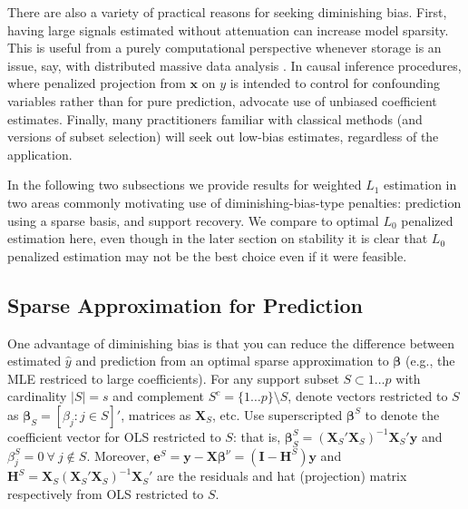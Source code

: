 \documentclass[12pt]{article}
\newcommand{\bs}[1]{\boldsymbol{#1}}
\newcommand{\bm}[1]{\mathbf{#1}}
\begin{document}
There are also a variety of practical reasons for seeking diminishing bias.
First, having large signals estimated without attenuation can increase model
sparsity. This is useful from a purely computational perspective whenever
storage is an issue, say, with distributed massive data analysis
\citep{taddy_distributed_2013}. In causal inference procedures, where
penalized projection from $\bm{x}$ on $y$ is intended to control for
confounding variables rather than for pure prediction,
\citet{belloni_inference_2012} advocate use of unbiased coefficient estimates.
Finally, many
practitioners familiar with classical methods (and versions of subset
selection) will seek out low-bias estimates, regardless of the application.

In the following two subsections we provide results for weighted $L_1$ estimation in two areas commonly motivating use of diminishing-bias-type penalties: prediction using a sparse basis, and support recovery.  We compare to optimal $L_0$ penalized estimation here, even though in the later section on stability it is clear that $L_0$ penalized estimation may not be the best choice even if it were feasible.

\subsection{Sparse Approximation for Prediction}

One advantage of diminishing bias is that you can reduce the difference between estimated $\hat y$ and prediction from an optimal sparse approximation to
$\bs{\beta}$ (e.g., the MLE restriced to large coefficients).  For any support subset $S \subset 1\ldots p$ with cardinality $|S|=s$ and complement $S^c = \{1\ldots p\}\setminus S$, denote vectors
restricted to $S$ as $\bm{\beta}_S = [\beta_j:j\in S]'$, matrices as $\bm{X}_S$, etc.  Use superscripted $\bs{\beta}^S$ to denote the coefficient vector for OLS restricted to $S$: that is, $\bs{\beta}^S_S = (\bm{X}_S'\bm{X}_S)^{-1}\bm{X}_S'\bm{y}$ and $\beta^{S}_j = 0~\forall~j\notin S$.  Moreover, 
$\bm{e}^S = \bm{y}-\bm{X}\bs{\beta}^\nu = (\bm{I}-\bm{H}^S)\bm{y}$ and 
$\bm{H}^S = \bm{X}_S(\bm{X}_S'\bm{X}_S)^{-1}\bm{X}_S'$ are the residuals and hat (projection) matrix respectively from OLS restricted to $S$.
\end{document}

